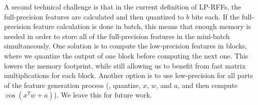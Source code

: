 A second technical challenge is that in the current definition of LP-RFFs, the full-precision features are calculated and then quantized to $b$ bits each. If the full-precision feature calculation is done in batch, this means that enough memory is needed in order to store all of the full-precision features in the mini-batch simultaneously. One solution is to compute the low-precision features in blocks, where we quantize the output of one block before computing the next one. This lowers the memory footprint, while still allowing us to benefit from fast matrix multiplications for each block. Another option is to use low-precision for all parts of the feature generation process (\eg, quantize, $x$, $w$, and $a$, and then compute $\cos(x^T w + a)$).  We leave this for future work.


